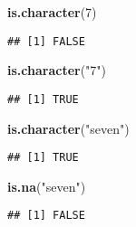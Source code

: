 \documentclass[8pt,ignorenonframetext,]{beamer}
\newenvironment{Shaded}{\begin{snugshade}}{\end{snugshade}}
\newcommand{\KeywordTok}[1]{\textcolor[rgb]{0.13,0.29,0.53}{\textbf{#1}}}
\newcommand{\DecValTok}[1]{\textcolor[rgb]{0.00,0.00,0.81}{#1}}
\newcommand{\StringTok}[1]{\textcolor[rgb]{0.31,0.60,0.02}{#1}}
\newcommand{\NormalTok}[1]{#1}
\begin{document}
\begin{frame}[fragile]{}

\begin{Shaded}
\begin{Highlighting}[]
\KeywordTok{is.character}\NormalTok{(}\DecValTok{7}\NormalTok{)}
\end{Highlighting}
\end{Shaded}

\begin{verbatim}
## [1] FALSE
\end{verbatim}

\begin{Shaded}
\begin{Highlighting}[]
\KeywordTok{is.character}\NormalTok{(}\StringTok{"7"}\NormalTok{)}
\end{Highlighting}
\end{Shaded}

\begin{verbatim}
## [1] TRUE
\end{verbatim}

\begin{Shaded}
\begin{Highlighting}[]
\KeywordTok{is.character}\NormalTok{(}\StringTok{"seven"}\NormalTok{)}
\end{Highlighting}
\end{Shaded}

\begin{verbatim}
## [1] TRUE
\end{verbatim}

\begin{Shaded}
\begin{Highlighting}[]
\KeywordTok{is.na}\NormalTok{(}\StringTok{"seven"}\NormalTok{)}
\end{Highlighting}
\end{Shaded}

\begin{verbatim}
## [1] FALSE
\end{verbatim}

\end{frame}
\end{document}
